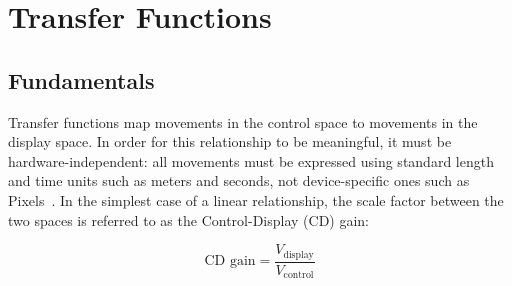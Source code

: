 \section{Transfer Functions}

\subsection{Fundamentals}

Transfer functions map movements in the control space to movements in the display space. In order for this relationship to be meaningful, it must be hardware-independent: all movements must be expressed using standard length and time units such as meters and seconds, not device-specific ones such as Pixels~\cite{casiez2011no}. In the simplest case of a linear relationship, the scale factor between the two spaces is referred to as the Control-Display (CD) gain:

\begin{equation}
    \text{CD gain} = \frac{V_{\text{display}}}{V_{\text{control}}}
\end{equation}

